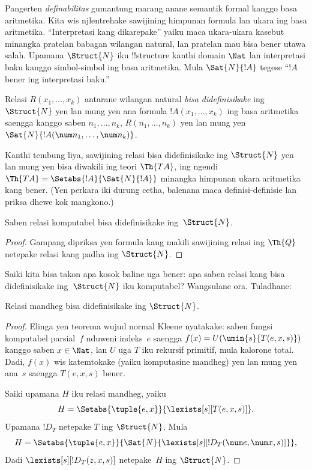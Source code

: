 \documentclass[../../../include/open-logic-section]{subfiles}
\begin{document}


Pangerten \emph{definabilitas} gumantung marang anane semantik formal
kanggo basa aritmetika. Kita wis njlentrehake sawijining himpunan
formula lan ukara ing basa aritmetika. ``Interpretasi kang
dikarepake'' yaiku maca ukara-ukara kasebut minangka pratelan
babagan wilangan natural, lan pratelan mau bisa bener utawa salah.
Upamana $\Struct{N}$ iku !!{structure} kanthi domain $\Nat$ lan
interpretasi baku kanggo simbol-simbol ing basa aritmetika.
Mula $\Sat{N}{!A}$ tegese ``$!A$ bener ing interpretasi baku.''

\begin{defn}
Relasi $R(x_1,\dots,x_k)$ antarane wilangan natural \emph{bisa
didefinisikake} ing $\Struct{N}$ yen lan mung yen ana formula
$!A(x_1,\dots,x_k)$ ing basa aritmetika saengga kanggo saben
$n_1,\dots,n_k$, $R(n_1,\dots,n_k)$ yen lan mung yen
$\Sat{N}{!A(\num n_1,\dots,\num n_k)}$.
\end{defn}

Kanthi tembung liya, sawijining relasi bisa didefinisikake ing
$\Struct{N}$ yen lan mung yen bisa diwakili ing teori
$\Th{TA}$, ing ngendi $\Th{TA} = \Setabs{!A}{\Sat{N}{!A}}$
minangka himpunan ukara aritmetika kang bener. (Yen perkara iki durung
cetha, balenana maca definisi-definisie lan priksa dhewe
kok mangkono.)

\begin{lem}
Saben relasi komputabel bisa didefinisikake ing~$\Struct{N}$.
\end{lem}

\begin{proof}
Gampang dipriksa yen formula kang makili sawijining
relasi ing $\Th{Q}$ netepake relasi kang padha ing $\Struct{N}$.
\end{proof}

Saiki kita bisa takon apa kosok baline uga bener: apa saben relasi
kang bisa didefinisikake ing~$\Struct{N}$ iku komputabel?
Wangsulane ora. Tuladhane:

\begin{lem}
Relasi mandheg bisa didefinisikake ing $\Struct{N}$.
\end{lem}

\begin{proof}
Elinga yen teorema wujud normal Kleene nyatakake: saben fungsi
komputabel parsial~$f$ nduweni indeks~$e$ saengga $f(x) =
U(\umin{s}{T(e,x,s)})$ kanggo saben $x \in \Nat$, lan $U$ uga
$T$ iku rekursif primitif, mula kalorone total. Dadi, $f(x)$
wis katemtokake (yaiku komputasine mandheg) yen lan mung yen ana~$s$
saengga $T(e,x,s)$ bener.

Saiki upamana $H$ iku relasi mandheg, yaiku
\[
H = \Setabs{\tuple{e,x}}{\lexists[s][T(e, x, s)]}.
\]
Upamana $!D_T$ netepake $T$ ing $\Struct{N}$. Mula
\[
H = \Setabs{\tuple{e,x}}{\Sat{N}{\lexists[s][!D_T(\num e, \num x, s)]}},
\]
Dadi $\lexists[s][!D_T(z, x, s)]$ netepake~$H$ ing
$\Struct{N}$.
\end{proof}
\end{document}
